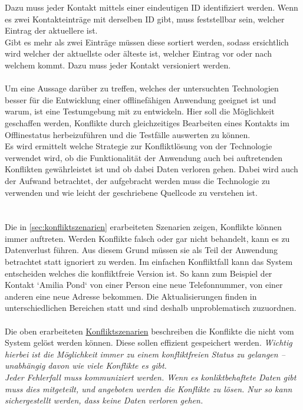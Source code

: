 Dazu muss jeder Kontakt mittels einer eindeutigen ID identifiziert werden. Wenn es zwei Kontakteinträge mit derselben ID gibt, muss feststellbar sein, welcher Eintrag der aktuellere ist.\\
Gibt es mehr als zwei Einträge müssen diese sortiert werden, sodass ersichtlich wird welcher der aktuellste oder älteste ist, welcher Eintrag vor oder nach welchem kommt. Dazu muss jeder Kontakt versioniert werden.\\\\
Um eine Aussage darüber zu treffen, welches der untersuchten Technologien besser für die Entwicklung einer offlinefähigen Anwendung geeignet ist und warum, ist eine Testumgebung mit zu entwickeln. Hier soll die Möglichkeit geschaffen werden, Konflikte durch gleichzeitiges Bearbeiten eines Kontakts im Offlinestatus herbeizuführen und die Testfälle auswerten zu können.\\
Es wird ermittelt welche Strategie zur Konfliktlösung von der Technologie verwendet wird, ob die Funktionalität der Anwendung auch bei auftretenden Konflikten gewährleistet ist und ob dabei Daten verloren gehen.
Dabei wird auch der Aufwand betrachtet, der aufgebracht werden muss die Technologie zu verwenden und wie leicht der geschriebene Quellcode zu verstehen ist.\\
\\\\
Die in \autoref{sec:konfliktszenarien} erarbeiteten Szenarien zeigen, Konflikte können immer auftreten. Werden Konflikte falsch oder gar nicht behandelt, kann es zu Datenverlust führen.
Aus diesem Grund müssen sie als Teil der Anwendung betrachtet statt ignoriert zu werden.
Im einfachen Konfliktfall kann das System entscheiden welches die konfliktfreie Version ist.
So kann zum Beispiel der Kontakt `Amilia Pond` von einer Person eine neue Telefonnummer, von einer anderen eine neue Adresse bekommen.
Die Aktualisierungen finden in unterschiedlichen Bereichen statt und sind deshalb unproblematisch zuzuordnen.\\\\
Die oben erarbeiteten \hyperref[sec:konfliktszenarien]{Konfliktszenarien} beschreiben die Konflikte die nicht vom System gelöst werden können.
Diese sollen effizient gespeichert werden. \it{Wichtig hierbei ist die Möglichkeit immer zu einem konfliktfreien Status zu gelangen -- unabhängig davon wie viele Konflikte es gibt.}\\
Jeder Fehlerfall muss kommuniziert werden. Wenn es konliktbehaftete Daten gibt muss dies mitgeteilt, und angeboten werden die Konflikte zu lösen. Nur so kann sichergestellt werden, dass keine Daten verloren gehen.